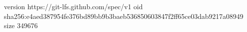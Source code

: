 version https://git-lfs.github.com/spec/v1
oid sha256:e4aed387954fe376bd89bb9b3baeb536850603847f2ff65ce03dab9217a08949
size 349676
